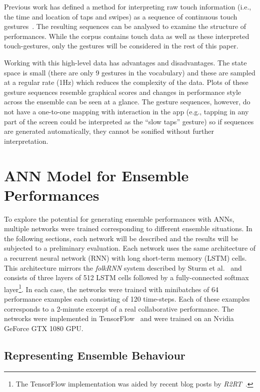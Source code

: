 \documentclass{article}
\begin{document}
Previous work has defined a method for interpreting raw touch
information (i.e., the time and location of taps and swipes) as a
sequence of continuous touch gestures~\cite{Martin:2015jk}. The
resulting sequences can be analysed to examine the structure of
performances. While the corpus contains touch data as well as these
interpreted touch-gestures, only the gestures will be considered in
the rest of this paper.

Working with this high-level data has advantages and disadvantages.
The state space is small (there are only 9 gestures in the vocabulary)
and these are sampled at a regular rate (1Hz) which reduces the
complexity of the data. Plots of these gesture sequences resemble
graphical scores and changes in performance style across the ensemble
can be seen at a glance. The gesture sequences, however, do not have a
one-to-one mapping with interaction in the app (e.g., tapping in any
part of the screen could be interpreted as the ``slow taps'' gesture)
so if sequences are generated automatically, they cannot be sonified
without further interpretation.

\section{ANN Model for Ensemble Performances}

To explore the potential for generating ensemble performances with
ANNs, multiple networks were trained corresponding to different
ensemble situations. In the following sections, each network will be
described and the results will be subjected to a preliminary
evaluation. Each network uses the same architecture of a recurrent
neural network (RNN) with long short-term memory (LSTM) cells. This
architecture mirrors the \emph{folkRNN} system described by Sturm et
al.~\cite{Sturm:2016rz} and consists of three layers of 512 LSTM cells
followed by a fully-connected softmax layer\footnote{The TensorFlow
  implementation was aided by recent blog posts by
  \emph{R2RT}~\cite{R2RT-RNN:2016}.}. In each case, the networks were
trained with minibatches of 64 performance examples each consisting of
120 time-steps. Each of these examples corresponds to a 2-minute
excerpt of a real collaborative performance. The networks were
implemented in TensorFlow~\cite{Abadi:2016wd} and were trained on an
Nvidia GeForce GTX 1080 GPU.

\subsection{Representing Ensemble Behaviour}
\end{document}
